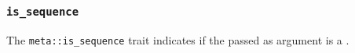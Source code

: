 
\subsubsection{\texttt{is\_sequence}}

The \texttt{meta::is\_sequence}
trait indicates if the  passed as argument is a .


